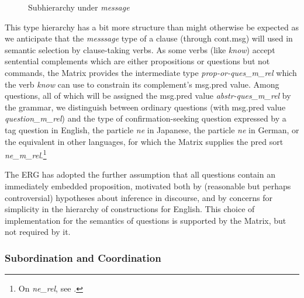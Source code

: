 \documentclass[12pt]{article}
\newcommand{\fn}{\footnote}
\begin{document}
\begin{figure}
\begin{center}

{\it
\begin{tree}
\end{tree}
}

\end{center}
\caption{Subhierarchy under {\it message}}
\label{msgfig}
\end{figure}

This type hierarchy has a bit more structure than might otherwise be
expected as we anticipate that the {\it messsage} type of a clause (through
{\sc cont.msg}) will used in semantic selection by
clause-taking verbs.  As some verbs (like {\it know}) accept sentential
complements which are either propositions or questions but not commands,
the Matrix provides the intermediate type {\it prop-or-ques\_m\_rel} which
the verb {\it know} can use to constrain its complement's {\sc msg.pred} value.
Among questions, all of which will be assigned the {\sc msg.pred} value
{\it abstr-ques\_m\_rel} by the grammar, we distinguish between
ordinary questions (with {\sc msg.pred} value {\it question\_m\_rel})
and the type of confirmation-seeking question expressed by a tag question in 
English, the particle {\it ne} in Japanese, the particle {\it ne} in German, 
or the equivalent in
other languages, for which the Matrix supplies the pred sort 
{\it ne\_m\_rel}.\fn{On {\it ne\_rel}, see .}

The ERG has adopted the further assumption that all questions contain an
immediately embedded proposition, motivated both by (reasonable but perhaps
controversial) hypotheses about inference in discourse, and by concerns for
simplicity in the hierarchy of constructions for English.  This choice of
implementation for the semantics of questions is supported by the Matrix, but 
not required by it.

\subsubsection{Subordination and Coordination}
\label{coordsec}
\end{document}
